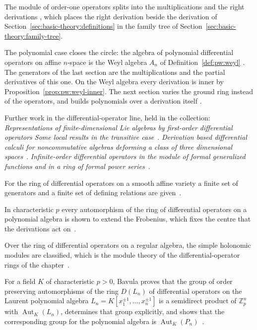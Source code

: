 The module of order-one operators splits into the multiplications and the
right derivations \cite[p.~29]{Sweedler1980}, which places the right
derivation beside the derivation of
Section~\ref{sec:basic-theory:definitions} in the family tree of
Section~\ref{sec:basic-theory:family-tree}. %

The polynomial case closes the circle: the algebra of polynomial
differential operators on affine $n$-space is the Weyl algebra $A_{n}$ of
Definition~\ref{def:pw:weyl} \cite[p.~1]{BelovKanelKontsevich2007}. The
generators of the last section are the multiplications and the partial
derivatives of this one. %
On the Weyl algebra every derivation is inner by
Proposition~\ref{prop:pw:weyl-inner}. The next section varies the ground
ring instead of the operators, and builds polynomials over a derivation
itself \cite[p.~480]{Ore1933}.

Further work in the differential-operator line, held in the collection:
\noindent\emph{Representations of finite-dimensional Lie algebras by first-order differential operators Some local results in the transitive case}~\cite{LibRepresentationsOfFiniteDimensional1995}.
\noindent\emph{Derivation based differential calculi for noncommutative algebras deforming a class of three dimensional spaces}~\cite{LibDerivationBasedDifferentialCalculi2018}.
\noindent\emph{Infinite-order differential operators in the module of formal generalized functions and in a ring of formal power series}~\cite{LibInfiniteOrderDifferentialOperators2022}.

For the ring of differential operators on a smooth affine variety a finite set of generators and a finite set of defining relations are given~\cite{WlGeneratorsAndDefining2010}.

In characteristic $p$ every automorphism of the ring of differential operators on a polynomial algebra is shown to extend the Frobenius, which fixes the centre that the derivations act on~\cite{WlExtensionsOfTheFrobeniusToTheR2017}.

Over the ring of differential operators on a regular algebra, the simple holonomic modules are classified, which is the module theory of the differential-operator rings of the chapter~\cite{WlSimpleHolonomicModulesOverRing2019}.

For a field $K$ of characteristic $p>0$, Bavula proves that the group of order preserving automorphisms of the ring $D(L_n)$ of differential operators on the Laurent polynomial algebra $L_n=K[x_1^{\pm1},\dots,x_n^{\pm1}]$ is a semidirect product of $\mathbb{Z}_p^n$ with $\operatorname{Aut}_K(L_n)$, determines that group explicitly, and shows that the corresponding group for the polynomial algebra is $\operatorname{Aut}_K(P_n)$~\cite{WlTheGroupOfOrderPreservingAutom2009}.

